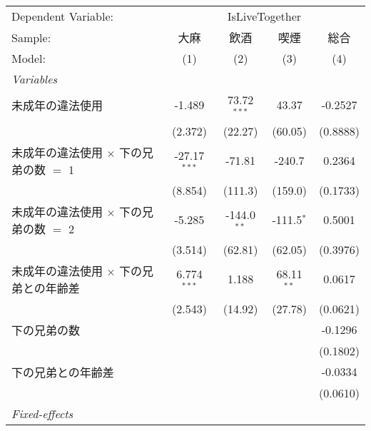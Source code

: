 \documentclass{article}
\begin{document}
\begingroup
\centering
\begin{threeparttable}[b]
   \begin{tabular}{lcccc}
      \tabularnewline \midrule \midrule
      Dependent Variable: & \multicolumn{4}{c}{IsLiveTogether}\\
      Sample:                                       & 大麻           & 飲酒          & 喫煙         & 総合 \\   
      Model:                                        & (1)            & (2)           & (3)          & (4)\\  
      \midrule
      \emph{Variables}\\
      未成年の違法使用                              & -1.489         & 73.72$^{***}$ & 43.37        & -0.2527\\   
                                                    & (2.372)        & (22.27)       & (60.05)      & (0.8888)\\   
      未成年の違法使用 $\times$ 下の兄弟の数 $=$ 1  & -27.17$^{***}$ & -71.81        & -240.7       & 0.2364\\   
                                                    & (8.854)        & (111.3)       & (159.0)      & (0.1733)\\   
      未成年の違法使用 $\times$ 下の兄弟の数 $=$ 2  & -5.285         & -144.0$^{**}$ & -111.5$^{*}$ & 0.5001\\   
                                                    & (3.514)        & (62.81)       & (62.05)      & (0.3976)\\   
      未成年の違法使用 $\times$ 下の兄弟との年齢差  & 6.774$^{***}$  & 1.188         & 68.11$^{**}$ & 0.0617\\   
                                                    & (2.543)        & (14.92)       & (27.78)      & (0.0621)\\   
      下の兄弟の数                                  &                &               &              & -0.1296\\   
                                                    &                &               &              & (0.1802)\\   
      下の兄弟との年齢差                            &                &               &              & -0.0334\\   
                                                    &                &               &              & (0.0610)\\   
      \midrule
      \emph{Fixed-effects}\\

\end{tabular}
\end{threeparttable}
\end{document}
